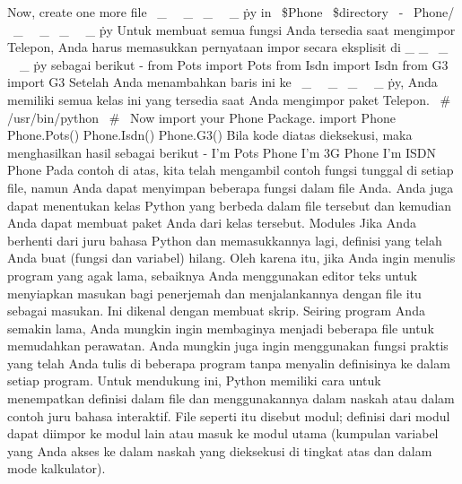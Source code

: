 Now, create one more file  \  \_  \ \  \_  \init \  \_  \ \  \_  \.py in \  \$Phone \  \$directory  \ - \ 
Phone/ \  \_  \ \  \_  \init \  \_  \ \  \_  \.py  
Untuk membuat semua fungsi Anda tersedia saat mengimpor Telepon, Anda harus memasukkan pernyataan impor secara eksplisit di    \_     \_  \init \  \_  \ \  \_  \.py sebagai berikut - 
 \hspace*{0.5in} from Pots import Pots 
 \hspace*{0.5in} from Isdn import Isdn  
 \hspace*{0.5in} from G3 import G3 
Setelah Anda menambahkan baris ini ke  \  \_  \ \  \_  \init \  \_  \ \  \_  \.py, Anda memiliki semua kelas ini yang tersedia saat Anda mengimpor paket Telepon. 
 \hspace*{0.5in}  \  \#  \!/usr/bin/python 
 \hspace*{0.5in}  \  \#  \ Now import your Phone Package. 
 \hspace*{0.5in} import Phone 
 \hspace*{0.5in} Phone.Pots()  
 \hspace*{0.5in} Phone.Isdn() 
 \hspace*{0.5in} Phone.G3() 
Bila kode diatas dieksekusi, maka menghasilkan hasil sebagai berikut -  
 \hspace*{0.5in} I'm Pots Phone  
 \hspace*{0.5in} I'm 3G Phone  
 \hspace*{0.5in} I'm ISDN Phone  
Pada contoh di atas, kita telah mengambil contoh fungsi tunggal di setiap file, namun Anda dapat menyimpan beberapa fungsi dalam file Anda. Anda juga dapat menentukan kelas Python yang berbeda dalam file tersebut dan kemudian Anda dapat membuat paket Anda dari kelas tersebut.
Modules  
Jika Anda berhenti dari juru bahasa Python dan memasukkannya lagi, definisi yang telah Anda buat (fungsi dan variabel) hilang. Oleh karena itu, jika Anda ingin menulis program yang agak lama, sebaiknya Anda menggunakan editor teks untuk menyiapkan masukan bagi penerjemah dan menjalankannya dengan file itu sebagai masukan. Ini dikenal dengan membuat skrip. Seiring program Anda semakin lama, Anda mungkin ingin membaginya menjadi beberapa file untuk memudahkan perawatan. Anda mungkin juga ingin menggunakan fungsi praktis yang telah Anda tulis di beberapa program tanpa menyalin definisinya ke dalam setiap program.  
Untuk mendukung ini, Python memiliki cara untuk menempatkan definisi dalam file dan menggunakannya dalam naskah atau dalam contoh juru bahasa interaktif. File seperti itu disebut modul; definisi dari modul dapat diimpor ke modul lain atau masuk ke modul utama (kumpulan variabel yang Anda akses ke dalam naskah yang dieksekusi di tingkat atas dan dalam mode kalkulator).  
